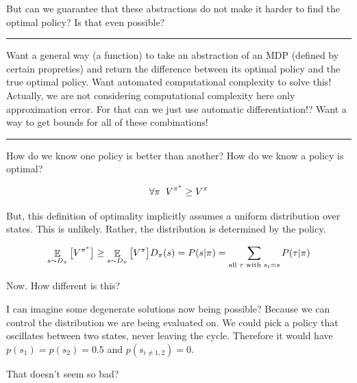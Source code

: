 But can we guarantee that these abstractions do not make it harder to
find the optimal policy? Is that even possible?

\begin{center}\rule{0.5\linewidth}{\linethickness}\end{center}

Want a general way (a function) to take an abstraction of an MDP
(defined by certain propreties) and return the difference between its
optimal policy and the true optimal policy. Want automated computational
complexity to solve this! Actually, we are not considering computational
complexity here only approximation error. For that can we just use
automatic differentiation!? Want a way to get bounds for all of these
combinations!

\begin{center}\rule{0.5\linewidth}{\linethickness}\end{center}

How do we know one policy is better than another? How do we know a
policy is optimal?

\[
\forall \pi\;\; V^{\pi^* } \ge V^{\pi} \\
\]

But, this definition of optimality implicitly assumes a uniform
distribution over states. This is unlikely. Rather, the distribution is
determined by the policy.

\[
\mathop{{\mathbb E}}_{s\sim D_{\pi}} \big[ V^{\pi^* } \big] \ge \mathop{{\mathbb E}}_{s\sim D_{\pi}} \big[ V^{\pi} \big] \\
D_{\pi}(s) = P(s | \pi) = \sum_{\text{all } \tau \text{ with } s_t = s} P(\tau | \pi)
\]

Now. How different is this?

I can imagine some degenerate solutions now being possible? Because we
can control the distribution we are being evaluated on. We could pick a
policy that oscillates between two states, never leaving the cycle.
Therefore it would have \(p(s_1) = p(s_2) = 0.5\) and
\(p(s_{i \neq 1,2}) = 0\).

That doesn't seem so bad?
